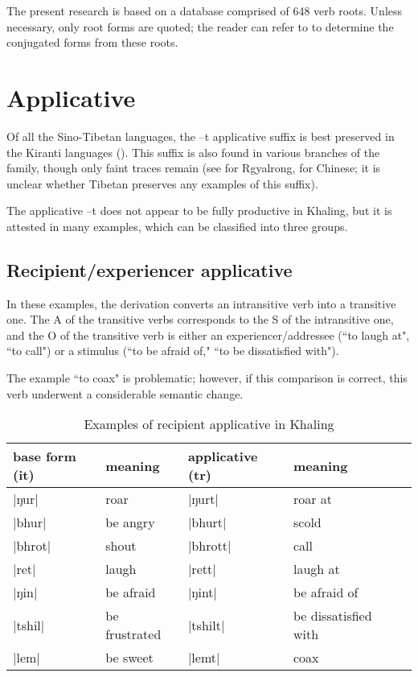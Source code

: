 \documentclass[oldfontcommands,oneside,a4paper,11pt]{article}
\newcommand{\ipa}[1]{{\phon #1}} %
\newcommand{\dhatu}[1]{|\ipa{#1}|}
\begin{document}
 The present research is based on a database comprised of 648 verb roots. Unless necessary, only root forms are quoted; the reader can refer to \citet{jacques12khaling} to determine the conjugated forms from these roots.

\section{Applicative}
Of all the Sino-Tibetan languages, the \ipa{--t} applicative suffix is best preserved in the Kiranti languages (\citealt{michailovsky85dental}). This suffix is also found in various branches of the family, though only faint traces remain (see \citealt[410]{jacques04these} for Rgyalrong, \citealt{sagart04directions} for Chinese; it is unclear whether Tibetan preserves any examples of this suffix).


The applicative \ipa{--t} does not appear to be fully productive in Khaling, but it is attested in many examples, which can be classified into three groups. 

\subsection{Recipient/experiencer applicative}

In these examples, the derivation converts an intransitive verb into a transitive one. The A of the transitive verbs corresponds to the S of the intransitive one, and the O of the transitive verb is either an experiencer/addressee (``to laugh at", ``to call") or a stimulus (``to be afraid of," ``to be dissatisfied with").

The example ``to coax" is problematic; however, if this comparison is correct, this verb underwent a considerable semantic change.
\begin{table}[H]
\caption{Examples of recipient applicative in Khaling} \label{tab:recipient.appl}
\begin{tabular}{lllll}
\toprule
base form (it) & meaning & applicative (tr) & meaning \\
\midrule
\dhatu{ŋur} & roar & \dhatu{ŋurt} &roar at\\
\dhatu{bhur} & be angry & \dhatu{bhurt} &scold\\
\dhatu{bhrot} & shout & \dhatu{bhrott} & call\\
\dhatu{ret} & laugh  & \dhatu{rett} & laugh at\\
\dhatu{ŋin} & be afraid  & \dhatu{ŋint} & be afraid of\\
\dhatu{tshil} & be frustrated  & \dhatu{tshilt} & be dissatisfied with\\
\dhatu{lem} & be sweet  & \dhatu{lemt} & coax\\
\bottomrule
\end{tabular}
\end{table}
\end{document}
